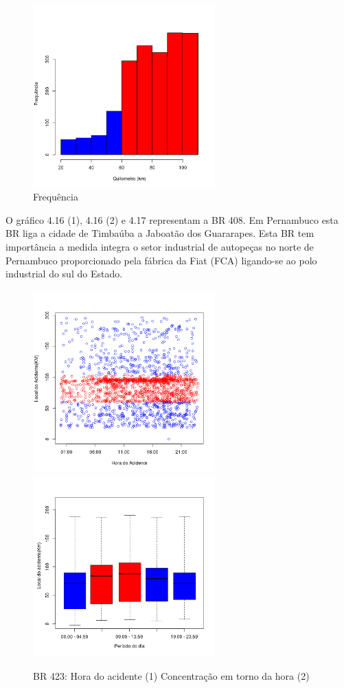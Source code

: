 \quad \quad
\begin{figure}[h]
	\centering
	\caption{ Frequência}
	\includegraphics[width=7cm,height=7cm]{Figuras/Preprocess/br408_3.png}
\end{figure}

O gráfico 4.16 (1), 4.16 (2)  e 4.17 representam a BR 408. Em Pernambuco esta BR liga a cidade de Timbaúba a Jaboatão dos Guararapes. Esta BR tem importância a medida integra o setor industrial de autopeças no norte de Pernambuco proporcionado pela fábrica da Fiat (FCA) ligando-se ao polo industrial do sul do Estado. 
\pagebreak

\begin{figure}[h]
	\caption{BR 423: Hora do acidente (1)  Concentração em torno da hora (2)}
	\includegraphics[width=7cm,height=7cm]{Figuras/Preprocess/br423_1.png}
	\includegraphics[width=7cm,height=7cm]{Figuras/Preprocess/br423_2.png}
	
\end{figure}

